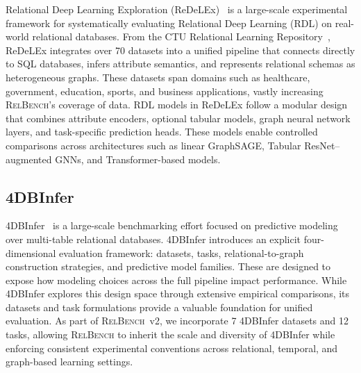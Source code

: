 \documentclass{article} %
\newcommand{\relbench}{\textsc{RelBench}\xspace}
\begin{document}
Relational Deep Learning Exploration (ReDeLEx)~\citep{peleska2025redelex} is a large-scale experimental framework for systematically evaluating Relational Deep Learning (RDL) on real-world relational databases. From the CTU Relational Learning Repository~\citep{motl2025ctupraguerelationallearning}, ReDeLEx integrates over 70 datasets into a unified pipeline that connects directly to SQL databases, infers attribute semantics, and represents relational schemas as heterogeneous graphs. These datasets span domains such as healthcare, government, education, sports, and business applications, vastly increasing \relbench's coverage of data. RDL models in ReDeLEx follow a modular design that combines attribute encoders, optional tabular models, graph neural network layers, and task-specific prediction heads. These models enable controlled comparisons across architectures such as linear GraphSAGE, Tabular ResNet–augmented GNNs, and Transformer-based models.

\subsection{4DBInfer} \label{sec:4dbinfer}

4DBInfer~\citep{wang20244dbinfer} is a large-scale benchmarking effort focused on predictive modeling over multi-table relational databases. 4DBInfer introduces an explicit four-dimensional evaluation framework: datasets, tasks, relational-to-graph construction strategies, and predictive model families. These are designed to expose how modeling choices across the full pipeline impact performance. While 4DBInfer explores this design space through extensive empirical comparisons, its datasets and task formulations provide a valuable foundation for unified evaluation. As part of \relbench~v2, we incorporate 7 4DBInfer datasets and 12 tasks, allowing \relbench to inherit the scale and diversity of 4DBInfer while enforcing consistent experimental conventions across relational, temporal, and graph-based learning settings.
\end{document}
